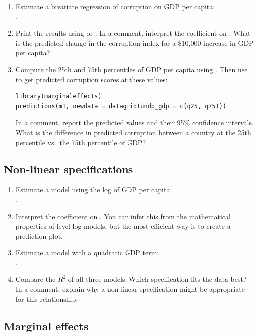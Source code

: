 \begin{enumerate}[label=\alph*)]
  \item Estimate a bivariate regression of corruption on GDP per capita: \\.
  \item Print the results using  or . In a comment, interpret the coefficient on . What is the predicted change in the corruption index for a \$10,000 increase in GDP per capita?
  \item Compute the 25th and 75th percentiles of GDP per capita using .
  Then use  to get predicted corruption scores at these values:
  \begin{lstlisting}
library(marginaleffects)
predictions(m1, newdata = datagrid(undp_gdp = c(q25, q75)))
  \end{lstlisting}
  In a comment, report the predicted values and their 95\% confidence intervals. What is the difference in predicted corruption between a country at the 25th percentile vs.\ the 75th percentile of GDP?
\end{enumerate}

\subsection{Non-linear specifications}

\begin{enumerate}[label=\alph*)]
  \item Estimate a model using the log of GDP per capita: \\.
  \item Interpret the coefficient on . You can infer this from the mathematical properties of level-log models, but the most efficient way is to create a prediction plot.
  \item Estimate a model with a quadratic GDP term: \\.
  \item Compare the $R^2$ of all three models. Which specification fits the data best? In a comment, explain why a non-linear specification might be appropriate for this relationship.
\end{enumerate}

\subsection{Marginal effects}

